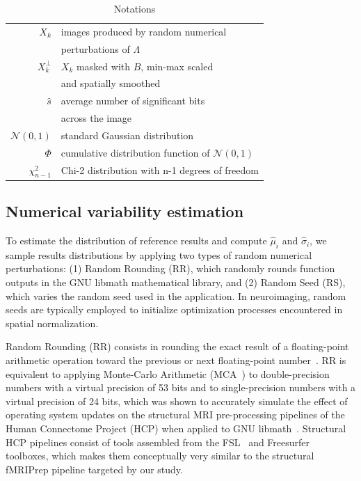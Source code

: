 \documentclass[lettersize,journal]{IEEEtran}
\begin{document}
\begin{table}
\begin{tabular}{r|l}
    $X_k$              & images produced by random numerical                       \\ &  perturbations of $\Lambda$       \\
    $X_k^{\perp}$      & $X_k$ masked with $B$, min-max scaled                     \\ &  and spatially smoothed         \\
    $\hat{s}$          & average number of significant bits                        \\ & across the image \\
    $\mathcal{N}(0,1)$ & standard Gaussian distribution                            \\
    $\Phi$             & cumulative distribution function of $\mathcal{N}(0,1)$    \\
    $\chi^2_{n-1}$     & Chi-2 distribution with n-1 degrees of freedom            \\
  \end{tabular}
  \caption{Notations}
  \label{tab:notations}
\end{table}


\subsection{Numerical variability estimation}

To estimate the distribution of reference results and compute $\hat \mu_i$ and $\hat \sigma_i$, we sample results distributions by applying two types of random numerical perturbations: (1) Random Rounding (RR), which randomly rounds function outputs in the GNU libmath mathematical library, and (2) Random Seed (RS), which varies the random seed used in the application. In neuroimaging, random seeds are typically employed to initialize optimization processes encountered in spatial normalization.

Random Rounding (RR) consists in rounding the exact result of a floating-point arithmetic operation toward the previous or next floating-point number~\cite{forsythe1959reprint}. RR is equivalent to applying Monte-Carlo Arithmetic (MCA~\cite{parker1997monte}) to double-precision numbers with a virtual precision of 53 bits and to single-precision numbers with a virtual precision of 24 bits, which was shown to accurately simulate the effect of operating system updates on the structural MRI pre-processing pipelines of the Human Connectome Project (HCP) when applied to GNU libmath~\cite{salari2021accurate}. Structural HCP pipelines consist of tools assembled from the FSL~\cite{jenkinson2012fsl} and Freesurfer~\cite{fischl2012freesurfer} toolboxes, which makes them conceptually very similar to the structural fMRIPrep pipeline targeted by our study.
\end{document}
